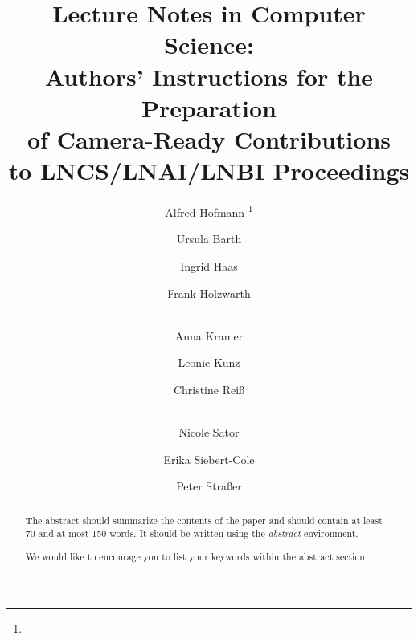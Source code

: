 \documentclass[runningheads,a4paper]{llncs}
\theoremstyle{definition}
\theoremstyle{plain}
\newcommand{\keywords}[1]{\par\addvspace\baselineskip
\noindent\keywordname\enspace\ignorespaces#1}
\begin{document}
\mainmatter  %

\title{Lecture Notes in Computer Science:\\Authors' Instructions
for the Preparation\\of Camera-Ready
Contributions\\to LNCS/LNAI/LNBI Proceedings}


%
%
\author{Alfred Hofmann%
\thanks{}%
\and Ursula Barth\and Ingrid Haas\and Frank Holzwarth\and\\
Anna Kramer\and Leonie Kunz\and Christine Rei\ss\and\\
Nicole Sator\and Erika Siebert-Cole\and Peter Stra\ss er}
%


%
%

\maketitle


\begin{abstract}
The abstract should summarize the contents of the paper and should
contain at least 70 and at most 150 words. It should be written using the
\emph{abstract} environment.
\keywords{We would like to encourage you to list your keywords within
the abstract section}
\end{abstract}
\end{document}
